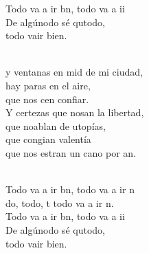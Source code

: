 \begin{cancion}
\begin{chorus}
	Todo va a ir bn, todo va a ii\\
	De algúnodo sé qutodo,\\
	todo vair bien.\\
	\end{chorus}%
	\jump\\
	y ventanas en mid de mi ciudad,\\
	hay paras en el aire,\\
	que nos cen confiar.\\
	Y certezas que nosan la libertad,\\
	que noablan de utopías,\\
	que congian valentía\\
	que nos estran un cano por an.\\\jump\\
	\begin{chorus}%
	Todo va a ir bn, todo va a ir n\\
	do, todo, t todo va a ir n.\\
	Todo va a ir bn, todo va a ii\\
	De algúnodo sé qutodo,\\
	todo vair bien.\\
	\end{chorus}%
	\jump\\
\end{cancion}%
